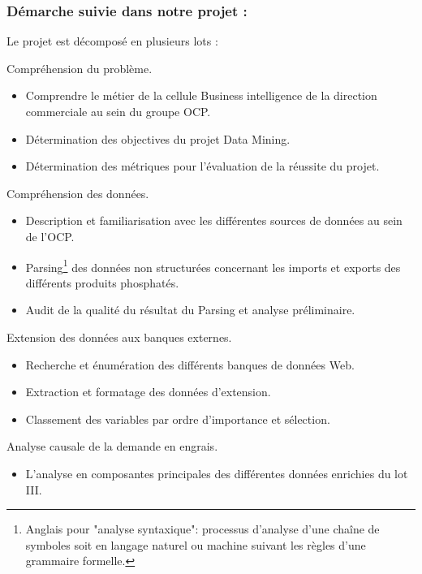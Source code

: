 	\subsubsection{Démarche suivie dans notre projet :}
	Le projet est décomposé en plusieurs lots :
	\begin{description}[align=left]
		\item[Lot I :] Compréhension du problème.
						\begin{itemize}
							\item Comprendre le métier de la cellule Business intelligence de la direction commerciale au sein du groupe OCP.
							\item Détermination des objectives du projet Data Mining.
							\item Détermination des métriques pour l'évaluation de la réussite du projet.
					   	\end{itemize}
		\item[Lot II :] Compréhension des données.
						\begin{itemize}
							\item Description et familiarisation avec les différentes sources de données au sein de l'OCP.
							\item Parsing\footnote{Anglais pour "analyse syntaxique": processus d'analyse d'une chaîne de symboles soit en langage naturel ou machine suivant les règles d'une grammaire formelle.} des données non structurées concernant les imports et exports des différents produits phosphatés.
							\item Audit de la qualité du résultat du Parsing et analyse préliminaire.
						\end{itemize}		 %
		\item[Lot III :] Extension des données aux banques externes.
						\begin{itemize}
							\item Recherche et énumération des différents banques de données Web.
							\item Extraction et formatage des données d'extension.
							\item Classement des variables par ordre d'importance et sélection.
						\end{itemize} %
		\item[Lot IV :] Analyse causale de la demande en engrais.
						\begin{itemize}
							\item L'analyse en composantes principales des différentes données enrichies du lot III.

\end{itemize}
\end{description}
